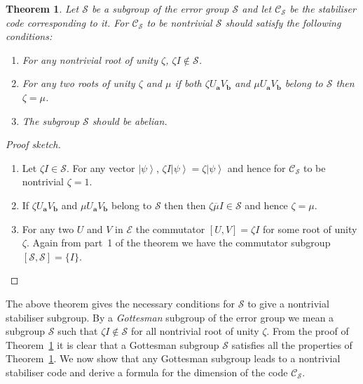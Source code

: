 \documentclass[11pt,twoside]{article}
\newtheorem{theorem}{Theorem}[section]
\theoremstyle{definition}
\theoremstyle{remark}
\newcommand{\ket}[1]{\ensuremath{\left\vert #1 \right\rangle}}
\begin{document}
\begin{theorem}\label{thm-stab-properties}
  Let $\mathcal{S}$ be a subgroup of the error group $\mathcal{S}$ and
  let $\mathcal{C}_\mathcal{S}$ be the stabiliser code corresponding
  to it. For $\mathcal{C}_\mathcal{S}$ to be nontrivial $\mathcal{S}$
  should satisfy the following conditions:
  \begin{enumerate}
  \item For any nontrivial root of unity $\zeta$, $\zeta I \not \in
    \mathcal{S}$.
  \item For any two roots of unity $\zeta$ and $\mu$ if both $\zeta
    U_\mathbf{a} V_\mathbf{b}$ and $\mu U_\mathbf{a} V_\mathbf{b}$
    belong to $\mathcal{S}$ then $\zeta = \mu$.
  \item The subgroup $\mathcal{S}$ should be abelian.
   \end{enumerate}
\end{theorem}
\begin{proof}[Proof sketch]\hfil\break
  \begin{enumerate}
  \item Let $\zeta I \in \mathcal{S}$. For any vector $\ket{\psi}$,
    $\zeta I \ket{\psi} = \zeta \ket{\psi}$ and hence for
    $\mathcal{C}_\mathcal{S}$ to be nontrivial $\zeta = 1$.
  \item If $\zeta U_\mathbf{a} V_\mathbf{b}$ and $\mu U_\mathbf{a}
    V_\mathbf{b}$ belong to $\mathcal{S}$ then then $\zeta
    \overline{\mu} I \in \mathcal{S}$ and hence $\zeta = \mu$.
  \item For any two $U$ and $V$ in $\mathcal{E}$ the commutator $[U,V]
    = \zeta I$ for some root of unity $\zeta$. Again from part~1 of
    the theorem we have the commutator subgroup
    $[\mathcal{S},\mathcal{S}] = \{ I\}$.
  \end{enumerate}
\end{proof}

The above theorem gives the necessary conditions for $\mathcal{S}$ to
give a nontrivial stabiliser subgroup.  By a \emph{Gottesman} subgroup
of the error group we mean a subgroup $\mathcal{S}$ such that $\zeta I
\not \in \mathcal{S}$ for all nontrivial root of unity $\zeta$. From
the proof of Theorem~\ref{thm-stab-properties} it is clear that a
Gottesman subgroup $\mathcal{S}$ satisfies all the properties of
Theorem~\ref{thm-stab-properties}. We now show that any Gottesman
subgroup leads to a nontrivial stabiliser code and derive a formula
for the dimension of the code $\mathcal{C}_\mathcal{S}$.
\end{document}
